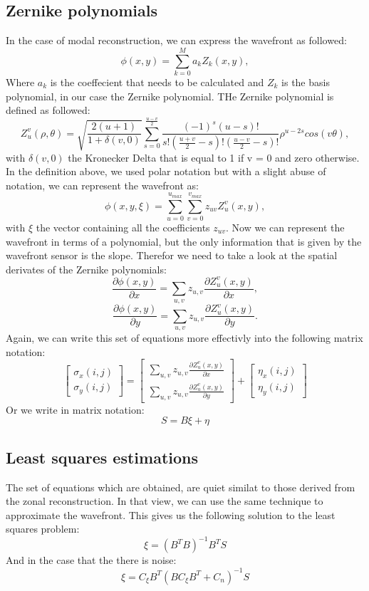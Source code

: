 \documentclass{article}
\begin{document}
\subsection{Zernike polynomials}
In the case of modal reconstruction, we can express the wavefront as followed:
$$
\phi (x,y) = \sum_{k=0}^{M}a_kZ_k(x,y), 
$$
Where $a_k$ is the coeffecient that needs to be calculated and $Z_k$ is the basis polynomial, in our case the Zernike polynomial. THe Zernike polynomial is defined as followed:
$$
Z_u^v(\rho,\theta) = \sqrt{\frac{2(u+1)}{1+\delta(v,0)}}\sum_{s=0}^{\frac{u-v}{2}}\frac{(-1)^s(u-s)!}{s!(\frac{u+v}{2}-s)!(\frac{u-v}{2}-s)!}
\rho^{u-2s}cos(v\theta),
$$
with $\delta(v,0)$ the Kronecker Delta that is equal to 1 if v = 0 and zero otherwise. In the definition above, we used polar notation but with a slight abuse of notation, we can represent the wavefront as:
$$
\phi (x,y,\xi) = \sum_{u=0}^{u_{max}}\sum_{v=0}^{v_{max}}z_{uv}Z_u^v(x,y),
$$
with $\xi$ the vector containing all the coefficients $z_{uv}$.
Now we can represent the wavefront in terms of a polynomial, but the only information that is given by the wavefront sensor is the slope. Therefor we need to take a look at the spatial derivates of the Zernike polynomials:
$$
\frac{\partial \phi(x,y)}{\partial x} = \sum_{u,v}z_{u,v}\frac{\partial Z_u^v(x,y)}{\partial x},
$$
$$
\frac{\partial \phi(x,y)}{\partial y} = \sum_{u,v}z_{u,v}\frac{\partial Z_u^v(x,y)}{\partial y}.
$$
Again, we can write this set of equations more effectivly into the following matrix notation:
$$
\begin{bmatrix}
\sigma_x(i,j) \\
\sigma_y(i,j)
\end{bmatrix}
=
\begin{bmatrix}
\sum_{u,v}z_{u,v}\frac{\partial Z_u^v(x,y)}{\partial x} \\
\sum_{u,v}z_{u,v}\frac{\partial Z_u^v(x,y)}{\partial y}
\end{bmatrix}
+
\begin{bmatrix}
\eta_x(i,j) \\
\eta_y(i,j)
\end{bmatrix}
$$
Or we write in matrix notation:
$$
S = B\xi + \eta
$$
\subsection{Least squares estimations}
The set of equations which are obtained, are quiet similat to those derived from the zonal reconstruction. In that view, we can use the same technique to approximate the wavefront. This gives us the following solution to the least squares problem:
$$
\hat{\xi} = (B^TB)^{-1}B^TS 
$$
And in the case that the there is noise:
$$
\hat{\xi} = C_\xi B^T(BC_\xi B^T + C_n)^{-1}S
$$
\end{document}
